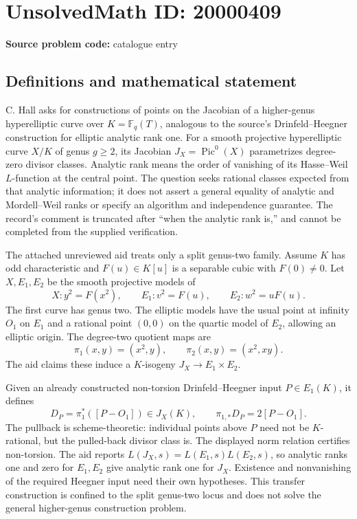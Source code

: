 \documentclass[11pt]{article}
\newcommand{\F}{\mathbb{F}}
\begin{document}
\section*{UnsolvedMath ID: 20000409}
\textbf{Source problem code:} catalogue entry
\subsection{Definitions and mathematical statement}
C. Hall asks for constructions of points on the Jacobian of a higher-genus hyperelliptic curve over $K=\F_q(T)$, analogous to the source's Drinfeld--Heegner construction for elliptic analytic rank one. For a smooth projective hyperelliptic curve $X/K$ of genus $g\ge2$, its Jacobian $J_X=\operatorname{Pic}^0(X)$ parametrizes degree-zero divisor classes. Analytic rank means the order of vanishing of its Hasse--Weil $L$-function at the central point. The question seeks rational classes expected from that analytic information; it does not assert a general equality of analytic and Mordell--Weil ranks or specify an algorithm and independence guarantee. The record's comment is truncated after ``when the analytic rank is,'' and cannot be completed from the supplied verification.

The attached unreviewed aid treats only a split genus-two family. Assume $K$ has odd characteristic and $F(u)\in K[u]$ is a separable cubic with $F(0)\ne0$. Let $X,E_1,E_2$ be the smooth projective models of
\[
X:y^2=F(x^2),\qquad E_1:v^2=F(u),\qquad E_2:w^2=uF(u).
\]
The first curve has genus two. The elliptic models have the usual point at infinity $O_1$ on $E_1$ and a rational point $(0,0)$ on the quartic model of $E_2$, allowing an elliptic origin. The degree-two quotient maps are
\[
\pi_1(x,y)=(x^2,y),\qquad\pi_2(x,y)=(x^2,xy).
\]
The aid claims these induce a $K$-isogeny $J_X\to E_1\times E_2$.

Given an already constructed non-torsion Drinfeld--Heegner input $P\in E_1(K)$, it defines
\[
D_P=\pi_1^*([P-O_1])\in J_X(K),\qquad
\pi_{1,*}D_P=2[P-O_1].
\]
The pullback is scheme-theoretic: individual points above $P$ need not be $K$-rational, but the pulled-back divisor class is. The displayed norm relation certifies non-torsion. The aid reports $L(J_X,s)=L(E_1,s)L(E_2,s)$, so analytic ranks one and zero for $E_1,E_2$ give analytic rank one for $J_X$. Existence and nonvanishing of the required Heegner input need their own hypotheses. This transfer construction is confined to the split genus-two locus and does not solve the general higher-genus construction problem.
\end{document}
